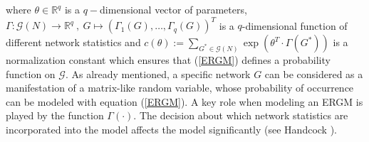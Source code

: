 \documentclass[headsepline=true, abstracton]{scrartcl}
\begin{document}
%
where $\theta \in \mathbb{R}^q$ is a $q-$dimensional vector of parameters, $\Gamma:\mathcal{G}(N) \to \mathbb{R}^q~,~G \mapsto (\Gamma_1(G),\dots,\Gamma_q(G))^T$ is a $q$-dimensional function of different network statistics and $c(\theta):= \sum_{G^* \in \mathcal{G}(N)} \exp(\theta^T \cdot \Gamma(G^*))$ is a normalization constant which ensures that (\ref{ERGM}) defines a probability function on $\mathcal{G}$.
%
As already mentioned, a specific network $G$ can be considered as a manifestation of a matrix-like random variable, whose probability of occurrence can be modeled with equation (\ref{ERGM}).
A key role when modeling an ERGM is played by the function $\Gamma(\cdot)$. The decision about which network statistics are incorporated into the model affects the model significantly (see Handcock \cite{Handcock.2003}).
\end{document}
